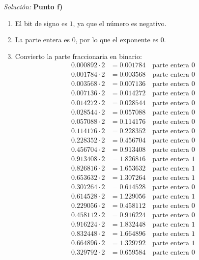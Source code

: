 \documentclass{article}
\newenvironment{solution}
    {\textit{Solución:}}
    {}
\begin{document}
\begin{solution}
\textbf{Punto f)}
\begin{enumerate}
    \item El bit de signo es $1$, ya que el número es negativo.
    \item La parte entera es $0$, por lo que el exponente es $0$.
    \item Convierto la parte fraccionaria en binario:
    \begin{align*}
        0.000892 \cdot 2 &= 0.001784 \quad \text{parte entera } 0\\
        0.001784 \cdot 2 &= 0.003568 \quad \text{parte entera } 0\\
        0.003568 \cdot 2 &= 0.007136 \quad \text{parte entera } 0\\
        0.007136 \cdot 2 &= 0.014272 \quad \text{parte entera } 0\\
        0.014272 \cdot 2 &= 0.028544 \quad \text{parte entera } 0\\
        0.028544 \cdot 2 &= 0.057088 \quad \text{parte entera } 0\\
        0.057088 \cdot 2 &= 0.114176 \quad \text{parte entera } 0\\
        0.114176 \cdot 2 &= 0.228352 \quad \text{parte entera } 0\\
        0.228352 \cdot 2 &= 0.456704 \quad \text{parte entera } 0\\
        0.456704 \cdot 2 &= 0.913408 \quad \text{parte entera } 0\\
        0.913408 \cdot 2 &= 1.826816 \quad \text{parte entera } 1\\
        0.826816 \cdot 2 &= 1.653632 \quad \text{parte entera } 1\\
        0.653632 \cdot 2 &= 1.307264 \quad \text{parte entera } 1\\
        0.307264 \cdot 2 &= 0.614528 \quad \text{parte entera } 0\\
        0.614528 \cdot 2 &= 1.229056 \quad \text{parte entera } 1\\
        0.229056 \cdot 2 &= 0.458112 \quad \text{parte entera } 0\\
        0.458112 \cdot 2 &= 0.916224 \quad \text{parte entera } 0\\
        0.916224 \cdot 2 &= 1.832448 \quad \text{parte entera } 1\\
        0.832448 \cdot 2 &= 1.664896 \quad \text{parte entera } 1\\
        0.664896 \cdot 2 &= 1.329792 \quad \text{parte entera } 1\\
        0.329792 \cdot 2 &= 0.659584 \quad \text{parte entera } 0\\

\end{align*}
\end{enumerate}
\end{solution}
\end{document}
